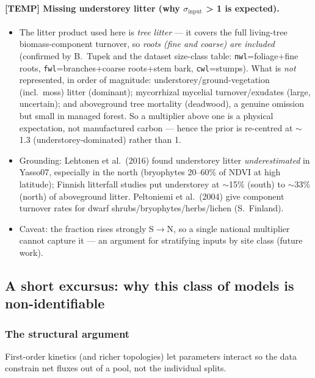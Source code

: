 \documentclass[11pt]{article}
\begin{document}
\paragraph{[TEMP] Missing understorey litter (why $\sigma_{\mathrm{input}}$ > 1 is expected).}
\begin{itemize}
\item The litter product used here is \emph{tree litter} --- it covers the full
  living-tree biomass-component turnover, so \emph{roots (fine and coarse) are
  included} (confirmed by B.\ Tupek and the dataset size-class table:
  \texttt{nwl}=foliage+fine roots, \texttt{fwl}=branches+coarse roots+stem bark,
  \texttt{cwl}=stumps). What is \emph{not} represented, in order of magnitude:
  understorey/ground-vegetation (incl.\ moss) litter (dominant); mycorrhizal
  mycelial turnover/exudates (large, uncertain); and aboveground tree mortality
  (deadwood), a genuine omission but small in managed forest. So a multiplier above
  one is a physical expectation, not manufactured carbon --- hence the prior is
  re-centred at $\sim$1.3 (understorey-dominated) rather than 1.
\item Grounding: Lehtonen et al.\ (2016) found understorey litter \emph{underestimated}
  in Yasso07, especially in the north (bryophytes 20--60\% of NDVI at high latitude);
  Finnish litterfall studies put understorey at $\sim$15\% (south) to $\sim$33\% (north)
  of aboveground litter. Peltoniemi et al.\ (2004) give component turnover rates for
  dwarf shrubs/bryophytes/herbs/lichen (S.\ Finland).
\item Caveat: the fraction rises strongly S$\to$N, so a single national multiplier cannot
  capture it --- an argument for stratifying inputs by site class (future work).
\end{itemize}

\subsection{A short excursus: why this class of models is non-identifiable}

\subsubsection{The structural argument}
First-order kinetics (and richer topologies) let parameters interact so the
data constrain net fluxes out of a pool, not the individual splits.
\end{document}
